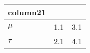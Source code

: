 \begin{table}[!tbp]
\begin{center}
\begin{tabular}{lll}
\hline\hline
\multicolumn{1}{c}{column21}&\multicolumn{1}{c}{}&\multicolumn{1}{c}{}\tabularnewline
\hline
$\mu$&1.1&3.1\tabularnewline
$\tau$&2.1&4.1\tabularnewline
\hline
\end{tabular}\end{center}
\end{table}
